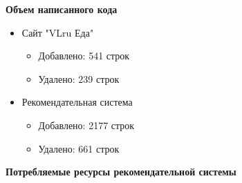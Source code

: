 \textbf{Объем написанного кода}

\begin{itemize}
  \item Сайт "VLru Еда"
    \begin{itemize}
      \item Добавлено: 541 строк
      \item Удалено: 239 строк
    \end{itemize}
  \item Рекомендательная система
    \begin{itemize}
      \item Добавлено: 2177 строк
      \item Удалено: 661 строк
    \end{itemize}
\end{itemize}

\textbf{Потребляемые ресурсы рекомендательной системы}
